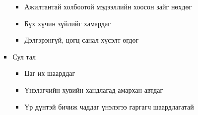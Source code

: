 \begin{enumerate}
\begin{enumerate}
\begin{itemize}
            \begin{itemize}
                \item Ажилтантай холбоотой мэдээллийн хоосон зайг нөхдөг
                \item Бүх хүчин зүйлийг хамардаг
                \item Дэлгэрэнгүй, цогц санал хүсэлт өгдөг
            \end{itemize}
            \item Сул тал
            \begin{itemize}
                \item Цаг их шаарддаг
                \item Үнэлэгчийн хувийн хандлагад амархан автдаг
                \item Үр дүнтэй бичиж чаддаг үнэлэгээ гаргагч шаардлагатай
            \end{itemize}
        \end{itemize}


\end{enumerate}
\end{enumerate}
